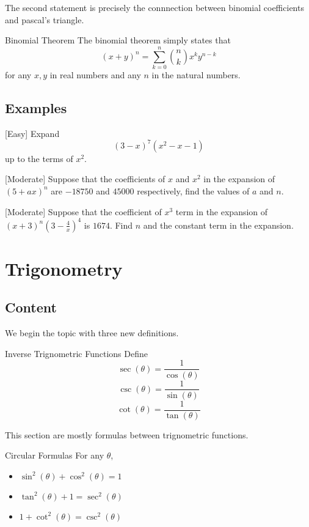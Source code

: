 \documentclass[a4paper]{article}
\begin{document}
The second statement is precisely the connnection between binomial coefficients and pascal's triangle. 

\begin{thm}{Binomial Theorem}{} The binomial theorem simply states that $$(x+y)^n=\sum_{k=0}^n\binom{n}{k}x^ky^{n-k}$$ for any $x,y$ in real numbers and any $n$ in the natural numbers. 
\end{thm}

\subsection{Examples}
\begin{eg}{[Easy]}{} Expand $$(3-x)^7(x^2-x-1)$$ up to the terms of $x^2$. 
\end{eg}

\begin{eg}{[Moderate]}{} Suppose that the coefficients of $x$ and $x^2$ in the expansion of $(5+ax)^n$ are $-18750$ and $45000$ respectively, find the values of $a$ and $n$. 
\end{eg}

\begin{eg}{[Moderate] }{}Suppose that the coefficient of $x^3$ term in the expansion of $(x+3)^n\left(3-\frac{4}{x}\right)^4$ is $1674$. Find $n$ and the constant term in the expansion. 
\end{eg}

\pagebreak
\section{Trigonometry}
\subsection{Content}
We begin the topic with three new definitions. 
\begin{defn}{Inverse Trignometric Functions}{} Define $$\sec(\theta)=\frac{1}{\cos(\theta)}$$ $$\csc(\theta)=\frac{1}{\sin(\theta)}$$ $$\cot(\theta)=\frac{1}{\tan(\theta)}$$
\end{defn}
This section are mostly formulas between trignometric functions. 
\begin{prp}{Circular Formulas}{} For any $\theta$,
\begin{itemize}
\item $\sin^2(\theta)+\cos^2(\theta)=1$
\item $\tan^2(\theta)+1=\sec^2(\theta)$
\item $1+\cot^2(\theta)=\csc^2(\theta)$
\end{itemize}
\end{prp}
\end{document}
